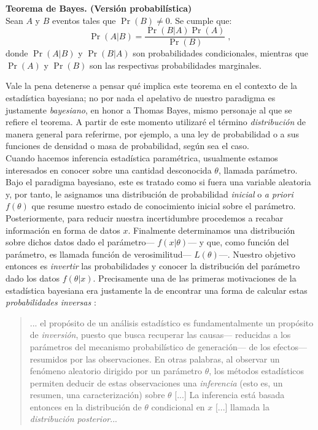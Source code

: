 \begin{teo} \label{teo:Bayes_1}
\textbf{Teorema de Bayes. (Versión probabilística)}\\
Sean $A$ y $B$ eventos tales que $\Pr(B) \neq 0$. Se cumple que: 
\begin{equation*}
\Pr(A|B)=\dfrac{\Pr(B|A)\Pr(A)}{\Pr(B)}\;,
\end{equation*}
donde $\Pr(A|B)$ y $\Pr(B|A)$ son probabilidades condicionales, mientras que $\Pr(A)$ y $\Pr(B)$ son las respectivas probabilidades marginales. 
\end{teo}

Vale la pena detenerse a pensar qué implica este teorema en el contexto de la estadística bayesiana; no por nada el apelativo de nuestro paradigma es justamente \textit{bayesiano}, en honor a Thomas Bayes, mismo personaje al que se refiere el teorema. A partir de este momento utilizaré el término \textit{distribución} de manera general para referirme, por ejemplo, a una ley de probabilidad o a sus funciones de densidad o masa de probabilidad, según sea el caso.\\ 

Cuando hacemos inferencia estadística paramétrica, usualmente estamos interesados en conocer sobre una cantidad desconocida $\theta$, llamada parámetro. Bajo el paradigma bayesiano, este es tratado como si fuera una variable aleatoria y, por tanto, le asignamos una  distribución de probabilidad \textit{inicial} o \textit{a priori} $f(\theta)$ que resume nuestro estado de conocimiento inicial sobre el parámetro. Posteriormente, para reducir nuestra incertidumbre procedemos a recabar información en forma de datos $x$. Finalmente determinamos una distribución sobre dichos datos dado el parámetro--- $f(x|\theta)$--- y que, como función del parámetro, es llamada función de verosimilitud--- $L(\theta)$---. Nuestro objetivo entonces es \textit{invertir} las probabilidades y conocer la distribución del parámetro dado los datos $f(\theta|x)$. Precisamente una de las primeras motivaciones de la estadística bayesiana era justamente la de encontrar una forma de calcular estas \textit{probabilidades inversas} \citep{Robert07}: 
\begin{quote}
... el propósito de un análisis estadístico es fundamentalmente un propósito de \textit{inversión}, puesto que busca recuperar las causas--- reducidas a los parámetros del mecanismo probabilístico de generación--- de los efectos--- resumidos por las observaciones. En otras palabras, al observar un fenómeno aleatorio dirigido por un parámetro $\theta$, los métodos estadísticos permiten deducir de estas observaciones una \textit{inferencia} (esto es, un resumen, una caracterización) sobre $\theta$ [...] La inferencia está basada entonces en la distribución de $\theta$ condicional en $x$ [...] llamada la \textit{distribución posterior}...
\end{quote} 

